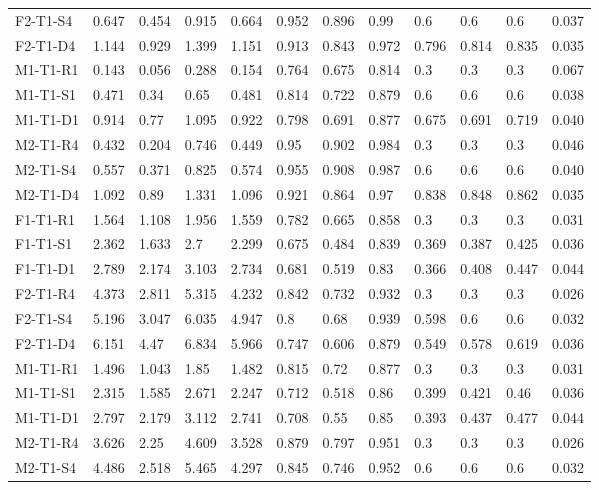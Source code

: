 \begin{table}[ht]
\begin{tabular}{llllllllllll}
  F2-T1-S4 & 0.647 & 0.454 & 0.915 & 0.664 & 0.952 & 0.896 & 0.99 & 0.6 & 0.6 & 0.6 &    0.037  \\ 
  F2-T1-D4 & 1.144 & 0.929 & 1.399 & 1.151 & 0.913 & 0.843 & 0.972 & 0.796 & 0.814 & 0.835 &    0.035  \\ 
  M1-T1-R1 & 0.143 & 0.056 & 0.288 & 0.154 & 0.764 & 0.675 & 0.814 & 0.3 & 0.3 & 0.3 &    0.067  \\ 
  M1-T1-S1 & 0.471 & 0.34 & 0.65 & 0.481 & 0.814 & 0.722 & 0.879 & 0.6 & 0.6 & 0.6 &    0.038  \\ 
  M1-T1-D1 & 0.914 & 0.77 & 1.095 & 0.922 & 0.798 & 0.691 & 0.877 & 0.675 & 0.691 & 0.719 &    0.040  \\ 
  M2-T1-R4 & 0.432 & 0.204 & 0.746 & 0.449 & 0.95 & 0.902 & 0.984 & 0.3 & 0.3 & 0.3 &    0.046  \\ 
  M2-T1-S4 & 0.557 & 0.371 & 0.825 & 0.574 & 0.955 & 0.908 & 0.987 & 0.6 & 0.6 & 0.6 &    0.040  \\ 
  M2-T1-D4 & 1.092 & 0.89 & 1.331 & 1.096 & 0.921 & 0.864 & 0.97 & 0.838 & 0.848 & 0.862 &    0.035  \\ 
  F1-T1-R1 & 1.564 & 1.108 & 1.956 & 1.559 & 0.782 & 0.665 & 0.858 & 0.3 & 0.3 & 0.3 & 0.031 \\ 
  F1-T1-S1 & 2.362 & 1.633 & 2.7 & 2.299 & 0.675 & 0.484 & 0.839 & 0.369 & 0.387 & 0.425 & 0.036 \\ 
  F1-T1-D1 & 2.789 & 2.174 & 3.103 & 2.734 & 0.681 & 0.519 & 0.83 & 0.366 & 0.408 & 0.447 & 0.044 \\ 
  F2-T1-R4 & 4.373 & 2.811 & 5.315 & 4.232 & 0.842 & 0.732 & 0.932 & 0.3 & 0.3 & 0.3 & 0.026 \\ 
  F2-T1-S4 & 5.196 & 3.047 & 6.035 & 4.947 & 0.8 & 0.68 & 0.939 & 0.598 & 0.6 & 0.6 & 0.032 \\ 
  F2-T1-D4 & 6.151 & 4.47 & 6.834 & 5.966 & 0.747 & 0.606 & 0.879 & 0.549 & 0.578 & 0.619 & 0.036 \\ 
  M1-T1-R1 & 1.496 & 1.043 & 1.85 & 1.482 & 0.815 & 0.72 & 0.877 & 0.3 & 0.3 & 0.3 & 0.031 \\ 
  M1-T1-S1 & 2.315 & 1.585 & 2.671 & 2.247 & 0.712 & 0.518 & 0.86 & 0.399 & 0.421 & 0.46 & 0.036 \\ 
  M1-T1-D1 & 2.797 & 2.179 & 3.112 & 2.741 & 0.708 & 0.55 & 0.85 & 0.393 & 0.437 & 0.477 & 0.044 \\ 
  M2-T1-R4 & 3.626 & 2.25 & 4.609 & 3.528 & 0.879 & 0.797 & 0.951 & 0.3 & 0.3 & 0.3 & 0.026 \\ 
  M2-T1-S4 & 4.486 & 2.518 & 5.465 & 4.297 & 0.845 & 0.746 & 0.952 & 0.6 & 0.6 & 0.6 & 0.032 \\ 

\end{tabular}
\end{table}

